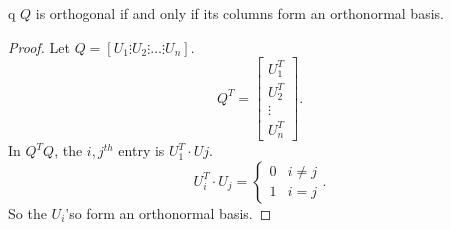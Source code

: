   \begin{prop}
    q $Q$ is orthogonal if and only if its columns form an orthonormal basis.
    \begin{proof}
      Let $Q=[U_1\vdots U_2 \vdots\ldots\vdots U_n]$.
      \[
      Q^{T}=\begin{bmatrix} U_1^{T}\\U_2^{T}\\ \vdots \\ U_n^{T} \end{bmatrix} 
      .\] 
      In $Q^{T}Q$, the $i,j^{th}$ entry is $U_1^{T}\cdot Uj$.
      \[
      U_i^{T}\cdot U_j =
      \begin{cases}
        0&i\neq j\\
        1&i=j
      \end{cases}
      .\] 
      So the $U_i$'so form an orthonormal basis.
    \end{proof}
  \end{prop}
